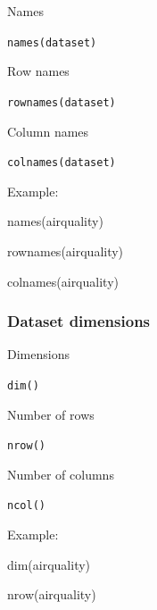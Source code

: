 \documentclass[
  letterpaper,
  DIV=11,
  numbers=noendperiod]{scrreprt}
\newenvironment{Shaded}{}{}
\newcommand{\FunctionTok}[1]{\textcolor[rgb]{0.44,0.26,0.76}{#1}}
\newcommand{\NormalTok}[1]{\textcolor[rgb]{0.14,0.16,0.18}{#1}}
\begin{document}
Names

\texttt{names(dataset)}

Row names

\texttt{rownames(dataset)}

Column names

\texttt{colnames(dataset)}

Example:

\begin{Shaded}
\begin{Highlighting}[]
\FunctionTok{names}\NormalTok{(airquality)}
\end{Highlighting}
\end{Shaded}

\begin{Shaded}
\begin{Highlighting}[]
\FunctionTok{rownames}\NormalTok{(airquality)}
\end{Highlighting}
\end{Shaded}

\begin{Shaded}
\begin{Highlighting}[]
\FunctionTok{colnames}\NormalTok{(airquality)}
\end{Highlighting}
\end{Shaded}

\subsubsection{Dataset dimensions}\label{dataset-dimensions}

Dimensions

\texttt{dim()}

Number of rows

\texttt{nrow()}

Number of columns

\texttt{ncol()}

Example:

\begin{Shaded}
\begin{Highlighting}[]
\FunctionTok{dim}\NormalTok{(airquality)}
\end{Highlighting}
\end{Shaded}

\begin{Shaded}
\begin{Highlighting}[]
\FunctionTok{nrow}\NormalTok{(airquality)}
\end{Highlighting}
\end{Shaded}
\end{document}
